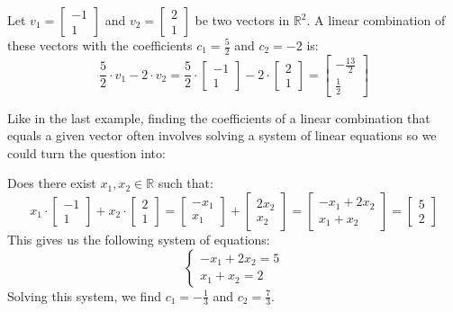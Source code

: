 \begin{eg}
    Let $v_1 = \begin{bmatrix} -1 \\ 1 \end{bmatrix}$ and $v_2 = \begin{bmatrix} 2 \\ 1 \end{bmatrix}$ be two vectors in $\mathbb{R}^2$. A linear combination of these vectors with the coefficients $c_1 = \frac{5}{2}$ and $c_2 = -2$ is:
    \[
        \frac{5}{2} \cdot v_1 - 2 \cdot v_2 = \frac{5}{2} \cdot \begin{bmatrix} -1 \\ 1 \end{bmatrix} - 2 \cdot \begin{bmatrix} 2 \\ 1 \end{bmatrix} = \begin{bmatrix} -\frac{13}{2} \\ \frac{1}{2} \end{bmatrix}
    \]
\end{eg}
Like in the last example, finding the coefficients of a linear combination that equals a given vector often involves solving a system of linear equations so we could turn the question into:
\begin{eg}
    Does there exist $x_1, x_2 \in \mathbb{R}$ such that:
    \[
        x_1 \cdot \begin{bmatrix} -1 \\ 1 \end{bmatrix} + x_2 \cdot \begin{bmatrix} 2 \\ 1 \end{bmatrix} = \begin{bmatrix} -x_1 \\ x_1 \end{bmatrix} + \begin{bmatrix} 2x_2 \\ x_2 \end{bmatrix} = \begin{bmatrix} -x_1 + 2x_2 \\ x_1 + x_2 \end{bmatrix} = \begin{bmatrix} 5 \\ 2 \end{bmatrix}
    \]
    This gives us the following system of equations:
    \[
        \begin{cases}
        -x_1 + 2x_2 = 5 \\
        x_1 + x_2 = 2
        \end{cases}
    \]
    Solving this system, we find $c_1 = -\frac{1}{3}$ and $c_2 = \frac{7}{3}$.
\end{eg}
